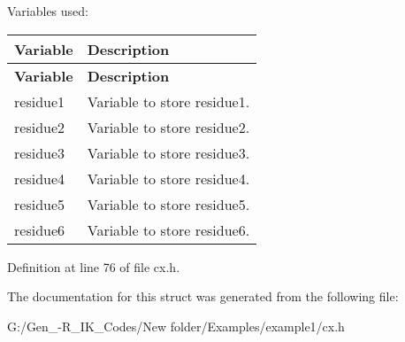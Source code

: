 Variables used\+: \tabulinesep=1mm
\begin{longtabu} spread 0pt [c]{*{2}{|X[-1]}|}
\hline
\rowcolor{\tableheadbgcolor}\textbf{ Variable }&\textbf{ Description  }\\
\endfirsthead
\hline
\endfoot
\hline
\rowcolor{\tableheadbgcolor}\textbf{ Variable }&\textbf{ Description  }\\
\endhead
residue1 &Variable to store residue1. \\
residue2 &Variable to store residue2. \\
residue3 &Variable to store residue3. \\
residue4 &Variable to store residue4. \\
residue5 &Variable to store residue5. \\
residue6 &Variable to store residue6. \\
\end{longtabu}


Definition at line 76 of file cx.\+h.



The documentation for this struct was generated from the following file\+:\begin{DoxyCompactItemize}
\item 
G\+:/\+Gen\+\_-\/\+R\+\_\+\+I\+K\+\_\+\+Codes/\+New folder/\+Examples/example1/cx.\+h\end{DoxyCompactItemize}
